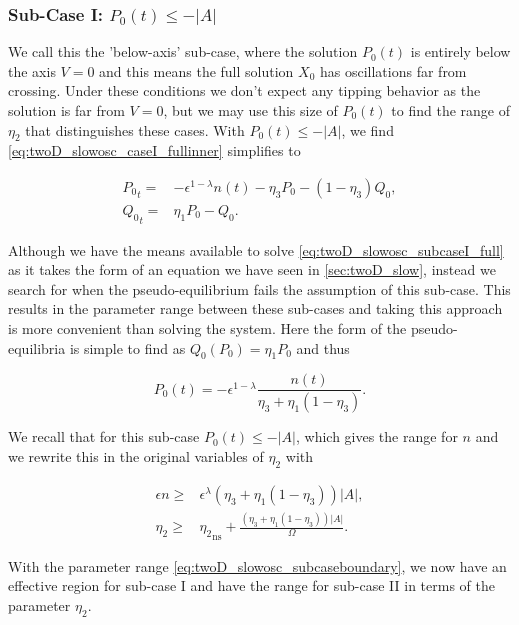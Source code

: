 \subsubsection{Sub-Case I: $P_0(t)\le -|A|$}

We call this the 'below-axis' sub-case, where the solution $P_0(t)$ is entirely below the axis $V=0$ and this means the full solution $X_0$ has oscillations far from crossing. Under these conditions we don't expect any tipping behavior as the solution is far from $V=0$, but we may use this size of $P_0(t)$ to find the range of $\eta_2$ that distinguishes these cases. With $P_0(t)\le -|A|$, we find \eqref{eq:twoD_slowosc_caseI_fullinner} simplifies to

\begin{equation}\label{eq:twoD_slowosc_subcaseI_full}
\begin{aligned}
{P_0}_t =& -\epsilon^{1-\lambda} n(t) -\eta_3 P_0-(1-\eta_3)Q_0, \\
{Q_0}_t =& \eta_1 P_0-Q_0.
\end{aligned}
\end{equation}

\indent Although we have the means available to solve \eqref{eq:twoD_slowosc_subcaseI_full} as it takes the form of an equation we have seen in \autoref{sec:twoD_slow}, instead we search for when the pseudo-equilibrium fails the assumption of this sub-case. This results in the parameter range between these sub-cases and taking this approach is more convenient than solving the system. Here the form of the pseudo-equilibria is simple to find as $Q_0(P_0) = \eta_1P_0$ and thus 

\begin{equation*}
P_0(t) = -\epsilon^{1-\lambda}\frac{n(t)}{\eta_3+\eta_1(1-\eta_3)}.
\end{equation*}

We recall that for this sub-case $P_0(t)\le -|A|$, which gives the range for $n$ and we rewrite this in the original variables of $\eta_2$ with

\begin{equation}\label{eq:twoD_slowosc_subcaseboundary}
\begin{aligned}
\epsilon n \ge & \epsilon^\lambda (\eta_3+\eta_1(1-\eta_3))|A|,\\
\eta_2 \ge& {\eta_2}_{\text{ns}} +\frac{(\eta_3+\eta_1(1-\eta_3))|A|}{\Omega}.
\end{aligned}
\end{equation}

With the parameter range \eqref{eq:twoD_slowosc_subcaseboundary}, we now have an effective region for sub-case I and have the range for sub-case II in terms of the parameter $\eta_2$.

